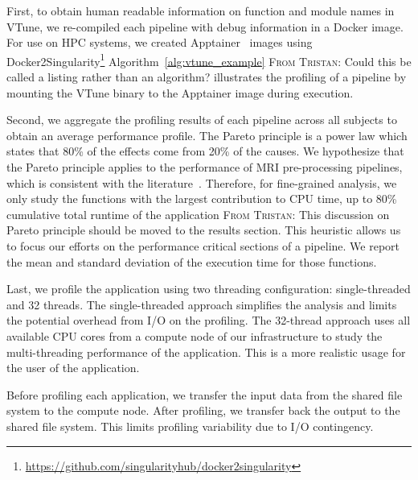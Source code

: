 \documentclass[conference]{IEEEtran}
\renewcommand{\lstlistingname}{Algorithm}
\newcommand{\TG}[1]{\color{blue}\textsc{From Tristan: }#1\color{black}}
\begin{document}
First, to obtain human readable information on function and module names in VTune, we re-compiled each pipeline with debug information in a Docker image. For use on HPC systems, we created Apptainer~\cite{Kurtzer2017-bu} images using Docker2Singularity\footnote{\href{https://github.com/singularityhub/docker2singularity}{https://github.com/singularityhub/docker2singularity}} \lstlistingname~\ref{alg:vtune_example} \TG{Could this be called a listing rather than an algorithm?} illustrates the profiling of a pipeline by mounting the VTune binary to the Apptainer image during execution.

\begin{minipage}{\linewidth}
	
\end{minipage}
				
Second, we aggregate the profiling results of each pipeline across all subjects to obtain an average performance profile. The Pareto principle is a power law which states that 80\% of the effects come from 20\% of the causes. We hypothesize that the Pareto principle applies to the performance of MRI pre-processing pipelines, which is consistent with the literature~\cite{Kukunas2015-jd}. Therefore, for fine-grained analysis, we only study the functions with the largest contribution to CPU time, up to 80\% cumulative total runtime of the application \TG{This discussion on Pareto principle should be moved to the results section}. This heuristic allows us to focus our efforts on the performance critical sections of a pipeline. We report the mean and standard deviation of the execution time for those functions.
			
Last, we profile the application using two threading configuration: single-threaded and 32 threads. The single-threaded approach simplifies the analysis and limits the potential overhead from I/O on the profiling. 
The 32-thread approach uses all available CPU cores from a compute node of our infrastructure to study the multi-threading performance of the application. This is a more realistic usage for the user of the application.
			
Before profiling each application, we transfer the input data from the shared file system to the compute node. After profiling, we transfer back the output to the shared file system. This limits profiling variability due to I/O contingency.
			
\end{document}
